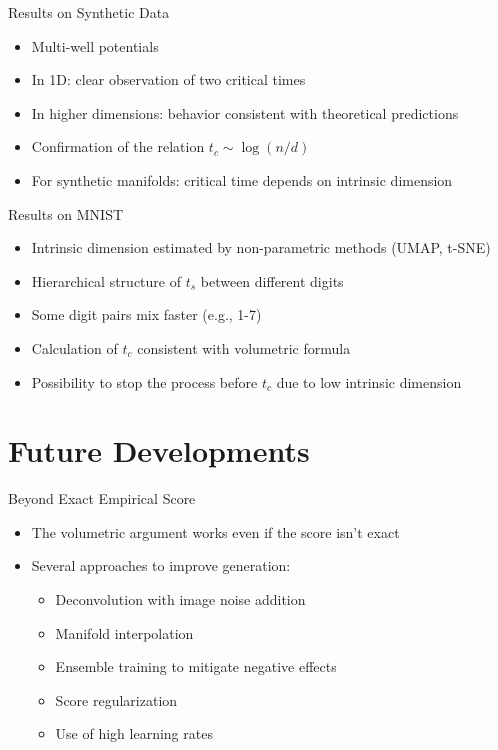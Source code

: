\documentclass[aspectratio=169]{beamer}
\begin{document}
\begin{frame}{Results on Synthetic Data}
    \begin{itemize}
        \item Multi-well potentials
        \item In 1D: clear observation of two critical times
        \item In higher dimensions: behavior consistent with theoretical predictions
        \item Confirmation of the relation $t_c \sim \log(n/d)$
        \item For synthetic manifolds: critical time depends on intrinsic dimension
    \end{itemize}
\end{frame}

\begin{frame}{Results on MNIST}
    \begin{itemize}
        \item Intrinsic dimension estimated by non-parametric methods (UMAP, t-SNE)
        \item Hierarchical structure of $t_s$ between different digits
        \item Some digit pairs mix faster (e.g., 1-7)
        \item Calculation of $t_c$ consistent with volumetric formula
        \item Possibility to stop the process before $t_c$ due to low intrinsic dimension
    \end{itemize}
\end{frame}

\section{Future Developments}

\begin{frame}{Beyond Exact Empirical Score}
    \begin{itemize}
        \item The volumetric argument works even if the score isn't exact
        \item Several approaches to improve generation:
        \begin{itemize}
            \item Deconvolution with image noise addition
            \item Manifold interpolation
            \item Ensemble training to mitigate negative effects
            \item Score regularization
            \item Use of high learning rates
        \end{itemize}
    \end{itemize}
\end{frame}
\end{document}
